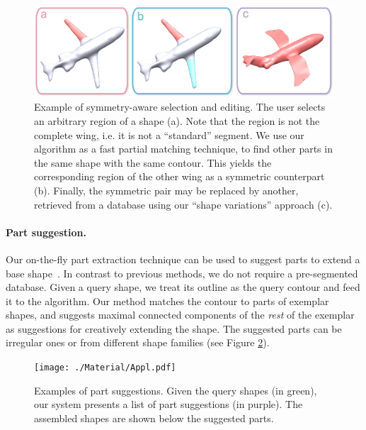 \begin{figure}\centering
\includegraphics[width=1.0\linewidth]{./Material/SymSel.pdf}
\caption{Example of symmetry-aware selection and editing. The user selects an arbitrary region of a shape (a). Note that the region is not the complete wing, i.e. it is not a ``standard'' segment. We use our algorithm as a fast partial matching technique, to find other parts in the same shape with the same contour. This yields the corresponding region of the other wing as a symmetric counterpart (b). Finally, the symmetric pair may be replaced by another, retrieved from a database using our ``shape variations'' approach (c).}\label{fig:SymSel}
\end{figure}

\paragraph*{Part suggestion.} Our on-the-fly part extraction technique can be used to suggest parts to extend a base shape~\cite{datadrivenvladenaisa2010,probabilisticreasoningvladlensg2011}. In contrast to previous methods, we do not require a pre-segmented database. Given a query shape, we treat its outline as the query contour and feed it to the algorithm. Our method matches the contour to parts of exemplar shapes, and suggests maximal connected components of the {\em rest} of the exemplar as suggestions for creatively extending the shape. The suggested parts can be irregular ones or from different shape families (see Figure \ref{fig:appl}).

\begin{figure}\centering
\texttt{[image: ./Material/Appl.pdf]}
\caption{Examples of part suggestions. Given the query shapes (in green), our system presents a list of part suggestions (in purple). The assembled shapes are shown below the suggested parts.}\label{fig:appl}
\end{figure}

